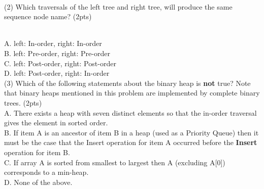 \documentclass[10.5pt]{article}
\begin{document}
~\\
(2) Which traversals of the left tree and right tree, will produce the same sequence node name? (2pts) \\
\begin{minipage}{1\textwidth}
\centering
{}
\end{minipage} \\
A. left: In-order, right: In-order \\
B. left: Pre-order, right: Pre-order \\
C. left: Post-order, right: Post-order \\
D. left: Post-order, right: In-order
~\\

(3) Which of the following statements about the binary heap is \textbf{not} true? Note that binary heaps mentioned in this problem are implemented by complete binary trees. (2pts) \\
A. There exists a heap with seven distinct elements so that the in-order traversal gives the element in sorted order. \\
B. If item A is an ancestor of item B in a heap (used as a Priority Queue) then it must be the case that the Insert operation for item A occurred before the \textbf{Insert} operation for item B.\\
C. If array A is sorted from smallest to largest then A (excluding A[0]) corresponds to a min-heap. \\
D. None of the above. 
\end{document}
